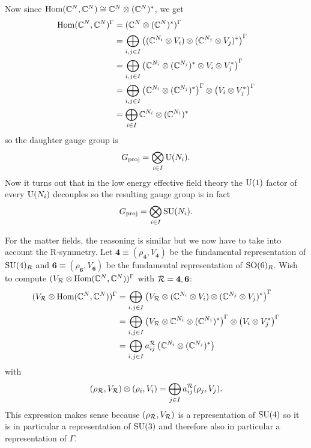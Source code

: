 \documentclass[a4paper,10pt]{article}
\begin{document}
        Now since $\text{Hom}(\mathbb{C}^N,\mathbb{C}^N)\cong\mathbb{C}^N\otimes(\mathbb{C}^N)^*$, we get
        \begin{align}
            \text{Hom}(\mathbb{C}^N,\mathbb{C}^N)^\Gamma &= (\mathbb{C}^N\otimes(\mathbb{C}^N)^*)^\Gamma\\
            &= \bigoplus_{i,j\in I} \left((\mathbb{C}^{N_i}\otimes V_i)\otimes(\mathbb{C}^{N_j}\otimes V_j)^*\right)^\Gamma\\
            &= \bigoplus_{i,j\in I} \left(\mathbb{C}^{N_i}\otimes(\mathbb{C}^{N_j})^*\otimes V_i\otimes V^*_j\right)^\Gamma\\
            &= \bigoplus_{i,j\in I} \left(\mathbb{C}^{N_i}\otimes(\mathbb{C}^{N_j})^*\right)^\Gamma\otimes\left(V_i\otimes V^*_j\right)^\Gamma\\
            &= \bigoplus_{i\in I}\mathbb{C}^{N_i}\otimes(\mathbb{C}^{N_i})^*
        \end{align}
        so the daughter gauge group is
        \begin{equation}
            G_{\text{proj}} = \bigotimes_{i\in I}\text{U}(N_i).
        \end{equation}
        Now it turns out that in the low energy effective field theory the $\text{U}(1)$ factor of every $\text{U}(N_i)$ decouples \marker so the resulting gauge group is in fact
        \begin{equation}
            G_{\text{proj}} = \bigotimes_{i\in I}\text{SU}(N_i).
        \end{equation}

        For the matter fields, the reasoning is similar but we now have to take into account the R-symmetry. Let $\boldsymbol{4}\equiv(\rho_{\boldsymbol{4}},V_{\boldsymbol{4}})$ be the fundamental representation of $\text{SU}(4)_R$ and $\boldsymbol{6}\equiv(\rho_{\boldsymbol{6}},V_{\boldsymbol{6}})$ be the fundamental representation of $\text{SO}(6)_R$. Wish to compute $(V_{\mathcal{R}}\otimes\text{Hom}(\mathbb{C}^N,\mathbb{C}^N))^\Gamma$ with $\mathcal{R}=\boldsymbol{4},\boldsymbol{6}$:
        \begin{align}
            (V_{\mathcal{R}}\otimes\text{Hom}(\mathbb{C}^N,\mathbb{C}^N))^\Gamma &= \bigoplus_{i,j\in I} \left(V_{\mathcal{R}}\otimes (\mathbb{C}^{N_i}\otimes V_i)\otimes(\mathbb{C}^{N_j}\otimes V_j)^*\right)^\Gamma\\
            &= \bigoplus_{i,j\in I} \left(V_{\mathcal{R}}\otimes\mathbb{C}^{N_i}\otimes(\mathbb{C}^{N_j})^*\right)^\Gamma\otimes\left(V_i\otimes V^*_j\right)^\Gamma\\
            &= \bigoplus_{i,j\in I}a^{\mathcal{R}}_{ij}\left(\mathbb{C}^{N_i}\otimes(\mathbb{C}^{N_j})^*\right)\label{eq:resdecomp}
        \end{align}
        with
        \begin{equation}
            (\rho_{\mathcal{R}},V_{\mathcal{R}})\otimes(\rho_i,V_i)=\bigoplus_{j\in I}a^{\mathcal{R}}_{ij}(\rho_j,V_j).\label{eq:defaij}
        \end{equation}
        This expression makes sense because $(\rho_{\mathcal{R}},V_{\mathcal{R}})$ is a representation of $\text{SU}(4)$ so it is in particular a representation of $\text{SU}(3)$ and therefore also in particular a representation of $\Gamma$.
\end{document}

